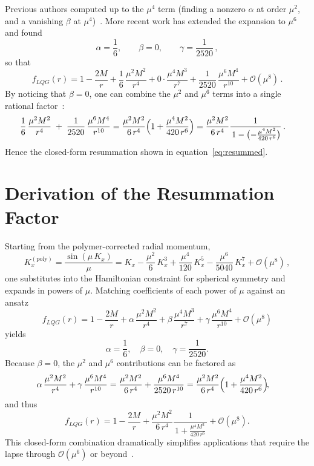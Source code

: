 \documentclass[11pt]{article}
\begin{document}
Previous authors computed up to the $\mu^4$ term (finding a nonzero $\alpha$ at order $\mu^2$, and a vanishing $\beta$ at $\mu^4$)~\cite{Modesto2006}.  More recent work has extended the expansion to $\mu^6$ and found
\[
\alpha = \frac{1}{6}, 
\qquad 
\beta = 0, 
\qquad 
\gamma = \frac{1}{2520}\,,
\]
so that
\[
f_{LQG}(r) 
= 1 - \frac{2M}{r}
+ \frac{1}{6}\,\frac{\mu^{2}M^{2}}{r^{4}}
+ 0\cdot\frac{\mu^{4}M^{3}}{r^{7}}
+ \frac{1}{2520}\,\frac{\mu^{6}M^{4}}{r^{10}}
+ \mathcal{O}(\mu^{8})\,.
\]
By noticing that $\beta=0$, one can combine the $\mu^2$ and $\mu^6$ terms into a single rational factor~\cite{Smith2025}:
\begin{align*}
\frac{1}{6}\,\frac{\mu^{2}M^{2}}{r^{4}}
\;+\;\frac{1}{2520}\,\frac{\mu^{6}M^{4}}{r^{10}}
&= \frac{\mu^{2}M^{2}}{6\,r^{4}}
  \Bigl(1 + \frac{\mu^{4}M^{2}}{420\,r^{6}}\Bigr)
= \frac{\mu^{2}M^{2}}{6\,r^{4}}
  \frac{1}{\,1 - \bigl(-\tfrac{\mu^{4}M^{2}}{420\,r^{6}}\bigr)}\,.
\end{align*}
Hence the closed-form resummation shown in equation~\eqref{eq:resummed}.

\section{Derivation of the Resummation Factor}

Starting from the polymer-corrected radial momentum,
\[
K_x^{(\mathrm{poly})} 
= \frac{\sin(\mu\,K_x)}{\mu}
= K_x - \frac{\mu^2}{6}\,K_x^3 + \frac{\mu^4}{120}\,K_x^5 - \frac{\mu^6}{5040}\,K_x^7 + \mathcal{O}(\mu^8)\,,
\]
one substitutes into the Hamiltonian constraint for spherical symmetry and expands in powers of $\mu$.  Matching coefficients of each power of $\mu$ against an ansatz
\[
f_{LQG}(r)
= 1 - \frac{2M}{r}
+ \alpha\,\frac{\mu^{2}M^{2}}{r^{4}}
+ \beta\,\frac{\mu^{4}M^{3}}{r^{7}}
+ \gamma\,\frac{\mu^{6}M^{4}}{r^{10}}
+ \mathcal{O}(\mu^{8})
\]
yields
\[
\alpha = \frac{1}{6}, 
\quad 
\beta = 0, 
\quad 
\gamma = \frac{1}{2520}.
\]
Because $\beta=0$, the $\mu^2$ and $\mu^6$ contributions can be factored as
\begin{align*}
\alpha\,\frac{\mu^{2}M^{2}}{r^{4}}
+ \gamma\,\frac{\mu^{6}M^{4}}{r^{10}}
&= \frac{\mu^{2}M^{2}}{6\,r^{4}}
+ \frac{\mu^{6}M^{4}}{2520\,r^{10}} 
= \frac{\mu^{2}M^{2}}{6\,r^{4}}
  \Bigl(1 + \frac{\mu^{4}M^{2}}{420\,r^{6}}\Bigr)\!,
\end{align*}
and thus
\[
f_{LQG}(r)
= 1 - \frac{2M}{r}
+ \frac{\mu^{2}M^{2}}{6\,r^{4}}
  \frac{1}{\,1 + \frac{\mu^{4}M^{2}}{420\,r^{6}}\,}
+ \mathcal{O}(\mu^{8}).
\]
This closed-form combination dramatically simplifies applications that require the lapse through $\mathcal{O}(\mu^6)$ or beyond~\cite{Smith2025}.
\end{document}

